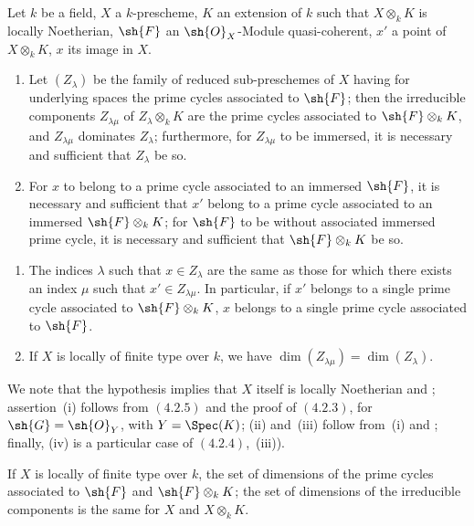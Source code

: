\begin{proposition}[4.2.7]
\label{IV.4.2.7}
Let $k$ be a field, $X$ a $k$-prescheme, $K$ an extension of $k$ such that $X\otimes_k K$ is locally Noetherian, $\sh{F}$ an $\sh{O}_X$-Module quasi-coherent, $x'$ a point of $X\otimes_k K$, $x$ its image in $X$.
\begin{enumerate}[label=(\roman*)]
  \item Let $(Z_\lambda)$ be the family of reduced sub-preschemes of $X$ having for underlying spaces the prime cycles associated to $\sh{F}$; then the irreducible components $Z_{\lambda\mu}$ of $Z_\lambda\otimes_k K$ are the prime cycles associated to $\sh{F}\otimes_k K$, and $Z_{\lambda\mu}$ dominates $Z_\lambda$; furthermore, for $Z_{\lambda\mu}$ to be immersed, it is necessary and sufficient that $Z_\lambda$ be so.
  \item For $x$ to belong to a prime cycle associated to an immersed $\sh{F}$, it is necessary and sufficient that $x'$ belong to a prime cycle associated to an immersed $\sh{F}\otimes_k K$; for $\sh{F}$ to be without associated immersed prime cycle, it is necessary and sufficient that $\sh{F}\otimes_k K$ be so.
\end{enumerate}
\end{proposition}

\begin{enumerate}
  \item[\rm(iii)] The indices $\lambda$ such that $x\in Z_\lambda$ are the same as those for which there exists an index $\mu$ such that $x'\in Z_{\lambda\mu}$.
In particular, if $x'$ belongs to a single prime cycle associated to $\sh{F}\otimes_k K$, $x$ belongs to a single prime cycle associated to $\sh{F}$.
  \item[\rm(iv)] If $X$ is locally of finite type over $k$, we have $\dim(Z_{\lambda\mu})=\dim(Z_\lambda)$.
\end{enumerate}

We note that the hypothesis implies that $X$ itself is locally Noetherian  and ; assertion~(i) follows from $(4.2.5)$ and the proof of $(4.2.3)$, for $\sh{G}=\sh{O}_Y$, with $Y=\Spec(K)$; (ii) and~(iii) follow from~(i) and ; finally, (iv) is a particular case of $(4.2.4)$,~(iii)).

\begin{corollary}[4.2.8]
\label{IV.4.2.8}
If $X$ is locally of finite type over $k$, the set of dimensions of the prime cycles associated to $\sh{F}$ and $\sh{F}\otimes_k K$; the set of dimensions of the irreducible components is the same for $X$ and $X\otimes_k K$.
\end{corollary}

